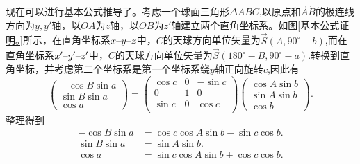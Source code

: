\documentclass[11pt, a4paper, oneside]{ctexart}
\numberwithin{equation}{subsection}
\begin{document}
现在可以进行基本公式推导了。考虑一个球面三角形$\Delta ABC$,以原点和$\overset{\frown}{AB}$的极连线方向为$y,y'$轴，以$OA$为$z$轴，以$OB$为$z'$轴建立两个直角坐标系。如图\ref{基本公式证明。}所示，在直角坐标系$x\text{\textendash}y\text{\textendash}z$中，$C$的天球方向单位矢量为$\vec{S}\left(A,90^{\circ}-b\right)$,而在直角坐标系$x'\text{\textendash}y'\text{\textendash}z'$中，$C$的天球方向单位矢量为$\vec{S}\left(180^{\circ}-B,90^{\circ}-a\right)$.转换到直角坐标，并考虑第二个坐标系是第一个坐标系绕$y$轴正向旋转$c$,因此有
\begin{equation}
\begin{pmatrix}
-\cos B\sin a\\
\sin B\sin a\\
\cos a
\end{pmatrix}=
\begin{pmatrix}
\cos c & 0 & -\sin c\\
0 & 1 & 0\\
\sin c & 0 & \cos c\\
\end{pmatrix}
\begin{pmatrix}
\cos A\sin b\\
\sin A\sin b\\
\cos b
\end{pmatrix}.
\end{equation}
整理得到
\begin{align}
-\cos B\sin a&=\cos c\cos A\sin b-\sin c\cos b.\label{1.1.9}\\
\sin B\sin a&=\sin A\sin b.\label{1.1.10}\\
\cos a&=\sin c\cos A\sin b+\cos c\cos b.\label{1.1.11}
\end{align}
\end{document}
